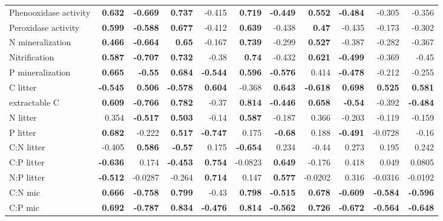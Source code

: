 \documentclass[10pt]{article}
\begin{document}
\begin{flushleft}
\begin{landscape}
\begin{table}[h!]
\begin{center}
{\begin{tabular}{lrrrrrrrrrr}
  Phenooxidase activity & \textbf{0.632} & \textbf{-0.669} & \textbf{0.737} & -0.415 & \textbf{0.719} & \textbf{-0.449} & \textbf{0.552} & \textbf{-0.484} & -0.305 & -0.356 \\ 
  Peroxidase activity & \textbf{0.599} & \textbf{-0.588} & \textbf{0.677} & -0.412 & \textbf{0.639} & -0.438 & \textbf{0.47} & -0.435 & -0.173 & -0.302 \\ 
  N mineralization & \textbf{0.466} & \textbf{-0.664} & \textbf{0.65} & -0.167 & \textbf{0.739} & -0.299 & \textbf{0.527} & -0.387 & -0.282 & -0.367 \\ 
  Nitrification & \textbf{0.587} & \textbf{-0.707} & \textbf{0.732} & -0.38 & \textbf{0.74} & -0.432 & \textbf{0.621} & \textbf{-0.499} & -0.369 & -0.45 \\ 
  P mineralization & \textbf{0.665} & \textbf{-0.55} & \textbf{0.684} & \textbf{-0.544} & \textbf{0.596} & \textbf{-0.576} & 0.414 & \textbf{-0.478} & -0.212 & -0.255 \\ 
  C litter & \textbf{-0.545} & \textbf{0.506} & \textbf{-0.578} & \textbf{0.604} & -0.368 & \textbf{0.643} & \textbf{-0.618} & \textbf{0.698} & \textbf{0.525} & \textbf{0.581} \\ 
  extractable C & \textbf{0.609} & \textbf{-0.766} & \textbf{0.782} & -0.37 & \textbf{0.814} & \textbf{-0.446} & \textbf{0.658} & \textbf{-0.54} & -0.392 & \textbf{-0.484} \\ 
  N litter & 0.354 & \textbf{-0.517} & \textbf{0.503} & -0.14 & \textbf{0.587} & -0.187 & 0.366 & -0.203 & -0.119 & -0.159 \\ 
  P litter & \textbf{0.682} & -0.222 & \textbf{0.517} & \textbf{-0.747} & 0.175 & \textbf{-0.68} & 0.188 & \textbf{-0.491} & -0.0728 & -0.16 \\ 
  C:N litter & -0.405 & \textbf{0.586} & \textbf{-0.57} & 0.175 & \textbf{-0.654} & 0.234 & -0.44 & 0.273 & 0.195 & 0.242 \\ 
  C:P litter & \textbf{-0.636} & 0.174 & \textbf{-0.453} & \textbf{0.754} & -0.0823 & \textbf{0.649} & -0.176 & 0.418 & 0.049 & 0.0805 \\ 
  N:P litter & \textbf{-0.512} & -0.0287 & -0.264 & \textbf{0.714} & 0.147 & \textbf{0.577} & -0.0202 & 0.316 & -0.0316 & -0.0192 \\ 
  C:N mic & \textbf{0.666} & \textbf{-0.758} & \textbf{0.799} & -0.43 & \textbf{0.798} & \textbf{-0.515} & \textbf{0.678} & \textbf{-0.609} & \textbf{-0.584} & \textbf{-0.596} \\ 
  C:P mic & \textbf{0.692} & \textbf{-0.787} & \textbf{0.834} & \textbf{-0.476} & \textbf{0.814} & \textbf{-0.562} & \textbf{0.726} & \textbf{-0.672} & \textbf{-0.564} & \textbf{-0.648} \\ 

\end{tabular}}
\end{center}
\end{table}
\end{landscape}
\end{flushleft}
\end{document}
